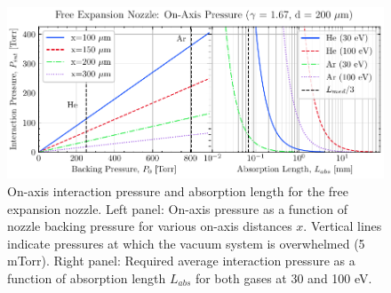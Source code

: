 \begin{figure}
	\centering
	\includegraphics[width=1.0\textwidth]{figures/chap3/on-axis-pressure.pdf}
	\caption{On-axis interaction pressure and absorption length for the free expansion nozzle. Left panel: On-axis pressure as a function of nozzle backing pressure for various on-axis distances $x$. Vertical lines indicate pressures at which the vacuum system is overwhelmed (5 mTorr). Right panel: Required average interaction pressure as a function of absorption length $L_{abs}$ for both gases at 30 and 100 eV.}
	\label{fig:on-axis-pressure}
\end{figure}

%

